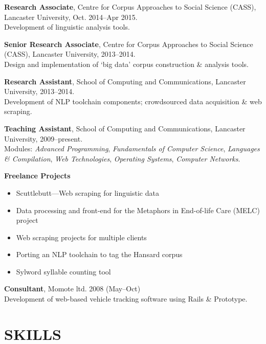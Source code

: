 \documentclass{res}
\begin{document}
\begin{resume}
    {\bf Research Associate},
    Centre for Corpus Approaches to Social Science (CASS),
    Lancaster University,
    Oct. 2014--Apr 2015.\\
    Development of linguistic analysis tools.

    {\bf Senior Research Associate},
    Centre for Corpus Approaches to Social Science (CASS),
    Lancaster University,
    2013--2014.\\
    Design and implementation of `big data' corpus construction \& analysis tools.

    {\bf Research Assistant},
    School of Computing and Communications,
    Lancaster University,
    2013--2014.\\
    Development of NLP toolchain components; crowdsourced data acquisition \& web scraping.

    {\bf Teaching Assistant},
    School of Computing and Communications,
    Lancaster University,
    2009--present.\\
    Modules: \textsl{Advanced Programming}, \textsl{Fundamentals of Computer Science}, \textsl{Languages \& Compilation}, \textsl{Web Technologies}, \textsl{Operating Systems}, \textsl{Computer Networks}.

    {\bf Freelance Projects}
    \begin{itemize}
        \item Scuttlebutt---Web scraping for linguistic data
        \item Data processing and front-end for the Metaphors in End-of-life Care (MELC) project
        \item Web scraping projects for multiple clients
        \item Porting an NLP toolchain to tag the Hansard corpus
        \item Sylword syllable counting tool
    \end{itemize}

    {\bf Consultant},
    Momote ltd.
    2008 (May--Oct)\\
    Development of web-based vehicle tracking software using Rails \& Prototype.




\section{SKILLS}
\vspace{0.1in}


\end{resume}
\end{document}
